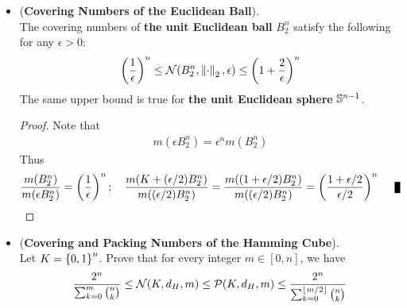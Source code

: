 \documentclass[11pt]{article}
\begin{document}
\begin{itemize}
\item \begin{corollary} (\textbf{Covering Numbers of the Euclidean Ball}). \citep{vershynin2018high}\\
The covering numbers of \textbf{the unit Euclidean ball} $B_2^n$ satisfy the following for any $\epsilon > 0$:
\begin{align}
\left(\frac{1}{\epsilon}\right)^n \le {\mathcal N}(B_2^n, \left\|\cdot\right\|_{2}, \epsilon)  \le \left(1+ \frac{2}{\epsilon}\right)^n  \label{ineqn: cover_num_vol_rn_unit_ball}
\end{align}
The same upper bound is true for \textbf{the unit Euclidean sphere} ${\mathbb S}^{n-1}$.
\end{corollary}
\begin{proof}
Note that
\begin{align*}
m(\epsilon B_2^n) = \epsilon^n m(B_2^n)
\end{align*} Thus
\begin{align*}
\frac{m(B_2^n)}{m(\epsilon B_2^n)} = \paren{\frac{1}{\epsilon}}^n; \quad \frac{m(K + (\epsilon/2) B_2^n)}{m((\epsilon/2) B_2^n)} = \frac{m((1+ \epsilon/2) B_2^n)}{m((\epsilon/2) B_2^n)} = \paren{\frac{1+ \epsilon/2}{\epsilon/2}}^n \qed
\end{align*}
\end{proof}

\item \begin{proposition}(\textbf{Covering and Packing Numbers of the Hamming Cube}). \citep{vershynin2018high}\\
Let $K = \left\{0, 1\right\}^n$. Prove that for every integer $m \in [0, n]$, we have
\begin{align}
\frac{2^n}{\sum_{k=0}^m{n \choose k}}  \le {\mathcal N}(K, d_{H}, m) \le {\mathcal P}(K, d_H, m) \le \frac{2^n}{\sum_{k=0}^{\left\lfloor m/2 \right\rfloor}{n \choose k}}  \label{ineqn: cover_num_vol_hamming_ball}
\end{align}
\end{proposition}


\end{itemize}
\end{document}

